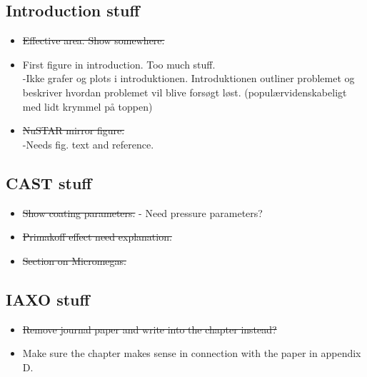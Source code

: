 \subsection{Introduction stuff}
\begin{itemize}
  \item \st{Effective area. Show somewhere.}\\
  \item First figure in introduction. Too much stuff.\\
      -Ikke grafer og plots i introduktionen. Introduktionen outliner problemet og beskriver hvordan problemet vil blive forsøgt løst. (populærvidenskabeligt med lidt krymmel på toppen)
  \item \st{NuSTAR mirror figure.}\\
      -Needs fig. text and reference.



\end{itemize}


\subsection{CAST stuff}
\begin{itemize}
  \item \st{ Show coating parameters.}
      - Need pressure parameters?
  \item \st{Primakoff effect need explanation.}
  \item \st{Section on Micromegas.}\\
\end{itemize}

\subsection{IAXO stuff}
\begin{itemize}
  \item \st{ Remove journal paper and write into the chapter instead?}
  \item Make sure the chapter makes sense in connection with the paper in appendix D.
\end{itemize}
